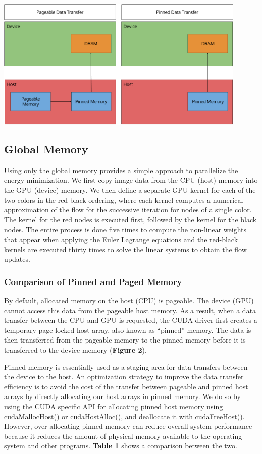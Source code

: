 \documentclass[english]{article}
\begin{document}
	\begin{center}
	\includegraphics[width=120mm]{results/images/2_pinned_paged.png}
	\end{center}		

	\subsection{Global Memory}
	Using only the global memory provides a simple approach to parallelize the energy minimization. We first copy image data from the CPU (host) memory into the GPU (device) memory. We then define a separate GPU kernel for each of the two colors in the red-black ordering, where each kernel computes a numerical approximation of the flow for the successive iteration for nodes of a single color. The kernel for the red nodes is executed first, followed by the kernel for the black nodes. The entire process is done five times to compute the non-linear weights that appear when applying the Euler Lagrange equations and the red-black kernels are executed thirty times to solve the linear systems to obtain the flow updates. 

	\subsubsection{Comparison of Pinned and Paged Memory}
	By default, allocated memory on the host (CPU) is pageable. The device (GPU) cannot access this data from the pageable host memory. As a result, when a data transfer between the CPU and GPU is requested, the CUDA driver first creates a temporary page-locked host array, also known as “pinned” memory. The data is then transferred from the pageable memory to the pinned memory before it is transferred to the device memory (\textbf{Figure 2}).\newline

	Pinned memory is essentially used as a staging area for data transfers between the device to the host. An optimization strategy to improve the data transfer efficiency is to avoid the cost of the transfer between pageable and pinned host arrays by directly allocating our host arrays in pinned memory. We do so by using the CUDA specific API for allocating pinned host memory using cudaMallocHost() or cudaHostAlloc(), and deallocate it with cudaFreeHost(). However, over-allocating pinned memory can reduce overall system performance because it reduces the amount of physical memory available to the operating system and other programs. \textbf{Table 1} shows a comparison between the two.\newline
\end{document}

